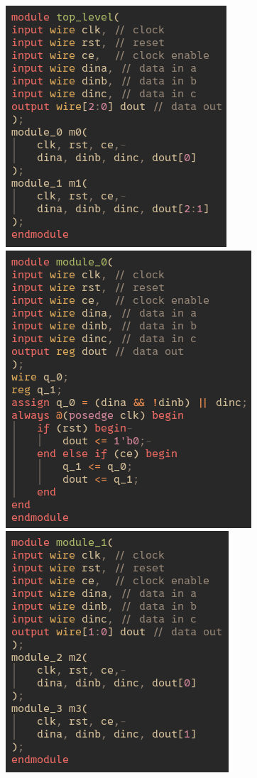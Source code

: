\documentclass{article}
\begin{document}
    {
        \raggedright
        \includegraphics[valign=t, scale=0.3]{figures/netlist_synth/top_level.png}
        \includegraphics[valign=t, scale=0.3]{figures/netlist_synth/module_0.png}
        \includegraphics[valign=t, scale=0.3]{figures/netlist_synth/module_1.png}
}
\end{document}
